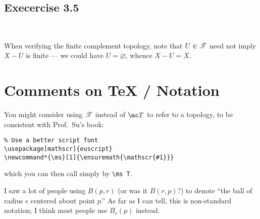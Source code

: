 \documentclass{fkpset}
\begin{document}
\subsection{Execercise 3.5}~
\begin{problem}[B1]
  When verifying the finite complement topology, note that $U \in \ms T$ need
  not imply $X - U$ is finite --- we could have $U = \varnothing$, whence $X - U
  = X$.
\end{problem}

\section{Comments on TeX / Notation}
\begin{problem}[C1]
  You might consider using $\ms T$ instead of $\mc T$ to refer to a topology, to
  be consistent with Prof.\ Su's book:
  \begin{lstlisting}
% Use a better script font
\usepackage[mathscr]{euscript}
\newcommand*{\ms}[1]{\ensuremath{\mathscr{#1}}}\end{lstlisting}
  which you can then call simply by \verb|\ms T|.
\end{problem}
\begin{problem}[C2]
  I saw a lot of people using $B(p, r)$ (or was it $B(r,p)$?) to denote ``the
  ball of radius $\epsilon$ centered about point $p$.'' As far as I can tell,
  this is non-standard notation; I think most people use $B_r(p)$ instead.
\end{problem}
\end{document}
